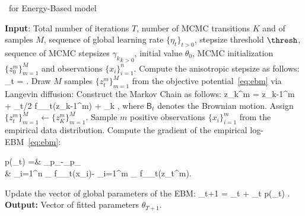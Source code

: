 \documentclass[letterpaper]{article} %
\begin{document}
\begin{algorithm}[H]
\caption{\algo\ for Energy-Based model} \label{alg:anila}
\begin{algorithmic}[1]
\STATE \textbf{Input}: Total number of iterations $T$, number of MCMC transitions $K$ and of samples $M$, sequence of global learning rate $\{\eta_t\}_{t >0}$, stepsize threshold $\thresh$,  sequence of MCMC stepsizes ${\gamma_k}_{k >0}$, initial value $\theta_0$, MCMC initialization $\{ z_{0}^m \}_{m=1}^M$ and observations $\{ x_{i} \}_{i=1}^n$.
\STATE Compute the anisotropic stepsize as follows: \label{line:step}
\beq\label{eq:step}
\stepsize_t =  \eqsp.
\eeq
\STATE Draw $M$ samples $\{ z_{t}^m \}_{m=1}^M$ from the objective potential~\eqref{eq:ebm} via Langevin diffusion:\label{line:langevin}
\STATE Construct the Markov Chain as follows:
\beq\label{eq:anila}
z_{k}^{m} = z_{k-1}^m + \stepsize_t/2  \nabla f_{\theta_t}(z_{k-1}^m) +  _k \eqsp,
\eeq
where $\mathsf{B}_t$ denotes the Brownian motion.
\ENDFOR
\STATE Assign $\{ z_{t}^m \}_{m=1}^M \leftarrow \{ z_{K}^m \}_{m=1}^M$.
\STATE Sample $m$ positive observations $\{ x_{i} \}_{i=1}^m$ from the empirical data distribution.
\STATE Compute the gradient of the empirical log-EBM~\eqref{eq:ebm}:
\beq\notag
\begin{split}
\nabla \log p(\theta_t) 
 =& _{p_{}}-_{p_{\theta}}\\
 &\hspace{-0.6in}\approx  {} \sum_{i=1}^{n} \nabla_{\theta} f_{\theta_t}\left(x_{i}\right)- \sum_{i=1}^{m} \nabla_{\theta} f_{\theta_t}\left(z_t^m\right)\eqsp.
\end{split}
\eeq
\STATE Update the vector of global parameters of the EBM:\label{line:gradient}
\beq\notag
\theta_{t+1} = \theta_{t} + \eta_t \nabla \log p(\theta_t) \eqsp.
\eeq
\ENDFOR
\STATE \textbf{Output:} Vector of fitted parameters $\theta_{T+1}$.
\end{algorithmic}
\end{algorithm}
\end{document}
